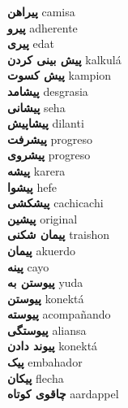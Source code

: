 \textbf{ پیراهن  } camisa \\
\textbf{ پیرو  } adherente \\
\textbf{ پیری  } edat \\
\textbf{ پیش بینی کردن  } kalkulá \\
\textbf{ پیش کسوت  } kampion \\
\textbf{ پیشامد  } desgrasia \\
\textbf{ پیشانی  } seha \\
\textbf{ پیشاپیش  } dilanti \\
\textbf{ پیشرفت  } progreso \\
\textbf{ پیشروی  } progreso \\
\textbf{ پیشه  } karera \\
\textbf{ پیشوا  } hefe \\
\textbf{ پیشکشی  } cachicachi \\
\textbf{ پیشین  } original \\
\textbf{ پیمان شکنی  } traishon \\
\textbf{ پیمان  } akuerdo \\
\textbf{ پینه  } cayo \\
\textbf{ پیوستن به  } yuda \\
\textbf{ پیوستن  } konektá \\
\textbf{ پیوسته  } acompañando \\
\textbf{ پیوستگی  } aliansa \\
\textbf{ پیوند دادن  } konektá \\
\textbf{ پیک  } embahador \\
\textbf{ پیکان  } flecha \\
\textbf{ چاقوی کوتاه  } aardappel \\
